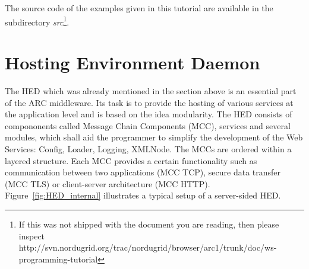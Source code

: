 

The source code of the examples given in this tutorial are available in the subdirectory \textit{src}\footnote{If this was not shipped with the document you are reading, then please inspect\\ http://svn.nordugrid.org/trac/nordugrid/browser/arc1/trunk/doc/ws-programming-tutorial}. 


\section{Hosting Environment Daemon}

The HED which was already mentioned in the section above is an essential part of the ARC middleware. 
Its task is to provide the hosting of various services at the application level and is based on the idea modularity.%
The HED consists of compononents called Message Chain Components (MCC), services and several modules, which shall aid the programmer to simplify the development of the Web Services: Config, Loader, Logging, XMLNode.
The MCCs are ordered within a layered structure. 
Each MCC provides a certain functionality such as communication between two applications (MCC TCP), secure data transfer (MCC TLS) or client-server architecture (MCC HTTP).
Figure~\ref{fig:HED_internal} illustrates a typical setup of a server-sided HED.

